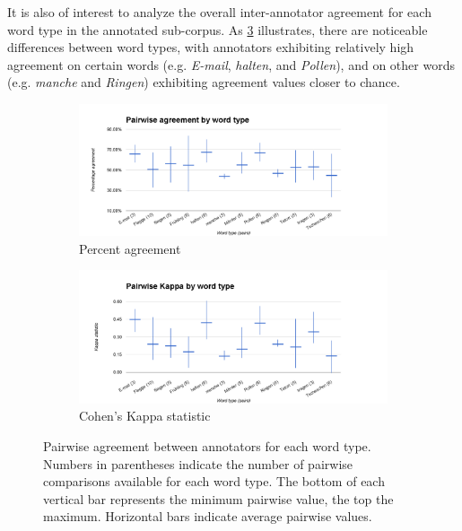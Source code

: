		It is also of interest to analyze the overall inter-annotator agreement for each word type in the annotated sub-corpus. As \cref{fig:agreement:words} illustrates, there are noticeable differences between word types, with annotators exhibiting relatively high agreement on certain words (e.g. \textit{E-mail}, \textit{halten}, and \textit{Pollen}), and on other words (e.g. \textit{manche} and \textit{Ringen}) exhibiting agreement values closer to chance. %
		
		
		\begin{figure}[htb]
			\centering
			
			\begin{subfigure}[b]{\textwidth}
				\centering
				\includegraphics[width=\textwidth]{img/annotation/pairAgreeWords}
				\caption{Percent agreement}
				\label{fig:agreement:words:pct}
			\end{subfigure}%
			
			\begin{subfigure}[b]{\textwidth}
				\centering
				\includegraphics[width=\textwidth]{img/annotation/pairKappaWords}
				\caption{Cohen's Kappa statistic}
				\label{fig:agreement:words:k}
			\end{subfigure}%
			
			\caption[Pairwise agreement statistics by word type]{Pairwise agreement between annotators for each word type. Numbers in parentheses indicate the number of pairwise comparisons available for each word type. The bottom of each vertical bar represents the minimum pairwise value, the top the maximum. Horizontal bars indicate average pairwise values.}
			\label{fig:agreement:words}
		\end{figure}
		
